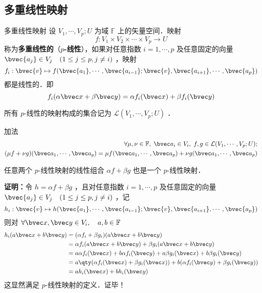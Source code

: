 \subsection{多重线性映射}
\begin{definition}{多重线性映射}
设 $V_1,\cdots,V_p;U$ 为域 $\mathbb{F}$ 上的矢量空间．映射
\begin{equation}
f:V_1\times V_2\times\cdots\times V_p\rightarrow U
\end{equation}
称为\textbf{多重线性的}（\textbf{$p$-线性}），如果对任意指数 $i=1,\cdots,p$ 及任意固定的向量 $\bvec{a_j}\in V_j\quad(1\leq j\leq p,j\neq i)$ ，映射
\begin{equation}
f_i:\bvec{v}\mapsto f(\bvec{a_1},\cdots,\bvec{a_{i-1}};\bvec{v},\bvec{a_{i+1}},\cdots,\bvec{a_p})
\end{equation}
都是线性的．即
\begin{equation}
f_i(\alpha\bvec x+\beta\bvec y)=\alpha f_i(\bvec x)+\beta f_i(\bvec y)
\end{equation}
\end{definition}
所有 $p$-线性的映射构成的集合记为 $\mathcal{L}(V_1,\cdots,V_p;U)$ ．
\begin{definition}{加法}
\begin{equation}
\begin{aligned}
\forall \mu,\nu\in\mathbb{F},\;\bvec a_i\in V_i,\;f,g\in \mathcal{L}(V_1,\cdots,V_p;U);\\
(\mu f+\nu g)(\bvec a_1,\cdots,\bvec a_p)=\mu f(\bvec a_1,\cdots,\bvec a_p)+\nu g(\bvec a_1,\cdots,\bvec a_p)
\end{aligned}
\end{equation}
\end{definition}
\begin{theorem}{}\label{MulMap_the1}
任意两个 $p$-线性映射的线性组合 $\alpha f+\beta g$ 也是一个 $p$-线性映射．
\end{theorem}
\textbf{证明：}令 $h=\alpha f+\beta g$ ，且对任意指数 $i=1,\cdots,p$ 及任意固定的向量 $\bvec{a_j}\in V_j\quad(1\leq j\leq p,j\neq i)$ ，记
\begin{equation}
h_i:\bvec{v}\mapsto h(\bvec{a_1},\cdots,\bvec{a_{i-1}};\bvec{v},\bvec{a_{i+1}},\cdots,\bvec{a_p})
\end{equation}
则对 $\forall \bvec x,\bvec y\in V_i,\quad a,b\in\mathbb{F}$
\begin{equation}
\begin{aligned}
h_i(a \bvec x+b\bvec y)&=(\alpha f_i+\beta g_i)(a \bvec x+b\bvec y)\\
&=\alpha f_i(a \bvec x+b\bvec y)+\beta g_i(a \bvec x+b\bvec y)\\
&=a\alpha f_i(\bvec x)+b\alpha f_i(\bvec y)+a\beta g_i(\bvec x)+b\beta g_i(\bvec y)\\
&=a\qty(\alpha f_i(\bvec x)+\beta g_i(\bvec x))+b(\alpha f_i(\bvec y)+\beta g_i(\bvec y))\\
&=ah_i(\bvec x)+bh_i(\bvec y)
\end{aligned}
\end{equation}
这显然满足 $p$-线性映射的定义．证毕！

